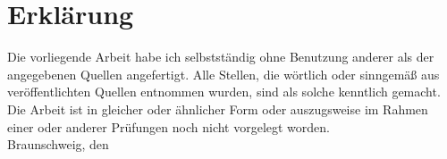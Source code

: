 %

%
%
%

\chapter*{Erklärung}
\thispagestyle{empty}
Die vorliegende Arbeit habe ich selbstständig ohne Benutzung anderer als der
angegebenen Quellen angefertigt. Alle Stellen, die wörtlich oder sinngemäß
aus veröffentlichten Quellen entnommen wurden, sind als solche
kenntlich gemacht. Die Arbeit ist in gleicher oder ähnlicher Form oder
auszugsweise im Rahmen einer oder anderer Prüfungen noch nicht vorgelegt
worden.
\\[2cm]
Braunschweig, den \hfill \namedesautors
